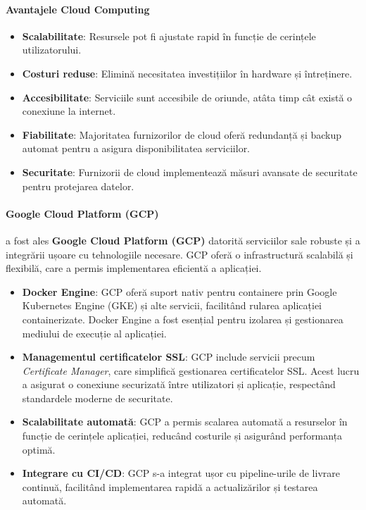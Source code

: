 \documentclass[titlepage,12pt]{article}
\begin{document}
\paragraph{Avantajele Cloud Computing}
\begin{itemize}
    \item \textbf{Scalabilitate}: Resursele pot fi ajustate rapid în funcție de cerințele utilizatorului.
    \item \textbf{Costuri reduse}: Elimină necesitatea investițiilor în hardware și întreținere.
    \item \textbf{Accesibilitate}: Serviciile sunt accesibile de oriunde, atâta timp cât există o conexiune la internet.
    \item \textbf{Fiabilitate}: Majoritatea furnizorilor de cloud oferă redundanță și backup automat pentru a asigura disponibilitatea serviciilor.
    \item \textbf{Securitate}: Furnizorii de cloud implementează măsuri avansate de securitate pentru protejarea datelor.
\end{itemize}

\paragraph{Google Cloud Platform (GCP)}
a fost ales \textbf{Google Cloud Platform (GCP)} datorită serviciilor sale robuste și a integrării ușoare cu tehnologiile necesare. GCP oferă o infrastructură scalabilă și flexibilă, care a permis implementarea eficientă a aplicației.

\begin{itemize}
    \item \textbf{Docker Engine}: GCP oferă suport nativ pentru containere prin Google Kubernetes Engine (GKE) și alte servicii, facilitând rularea aplicației containerizate. Docker Engine a fost esențial pentru izolarea și gestionarea mediului de execuție al aplicației.
    \item \textbf{Managementul certificatelor SSL}: GCP include servicii precum \textit{Certificate Manager}, care simplifică gestionarea certificatelor SSL. Acest lucru a asigurat o conexiune securizată între utilizatori și aplicație, respectând standardele moderne de securitate.
    \item \textbf{Scalabilitate automată}: GCP a permis scalarea automată a resurselor în funcție de cerințele aplicației, reducând costurile și asigurând performanța optimă.
    \item \textbf{Integrare cu CI/CD}: GCP s-a integrat ușor cu pipeline-urile de livrare continuă, facilitând implementarea rapidă a actualizărilor și testarea automată.
\end{itemize}
\end{document}
